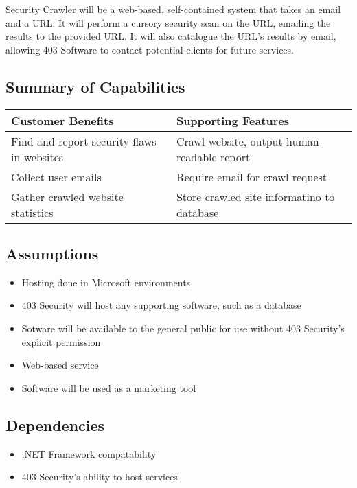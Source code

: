 Security Crawler will be a web-based, self-contained system that takes an email and a URL.  It will perform a cursory security scan on the URL, emailing the results to the provided URL.  It will also catalogue the URL's results by email, allowing 403 Software to contact potential clients for future services.

\subsection{Summary of Capabilities}
\begin{tabularx}{\textwidth}{|X|X|}
    \hline
    {\bf Customer Benefits} & {\bf Supporting Features} \\ \hline
    Find and report security flaws in websites & Crawl website, output human-readable report \\ \hline
    Collect user emails & Require email for crawl request \\ \hline
    Gather crawled website statistics & Store crawled site informatino to database \\ \hline 
\end{tabularx}

\subsection{Assumptions}
\begin{itemize}
    \item Hosting done in Microsoft environments
    \item 403 Security will host any supporting software, such as a database
    \item Sotware will be available to the general public for use without 403 Security's explicit permission
    \item Web-based service
    \item Software will be used as a marketing tool
\end{itemize}

\subsection{Dependencies}
\begin{itemize}
    \item .NET Framework compatability
    \item 403 Security's ability to host services
\end{itemize}

